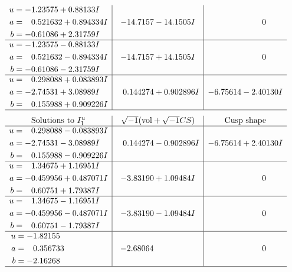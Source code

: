 \documentclass[1p]{elsarticle_modified}
\theoremstyle{definition}
\newcommand{\I}{\sqrt{-1}}
\begin{document}
$$\begin{array}{c|c|c}
\begin{aligned}
u &= -1.23575 + 0.88133 I \\
a &= \phantom{-}0.521632 + 0.894334 I \\
b &= -0.61086 + 2.31759 I\end{aligned}
 & -14.7157 - 14.1505 I & \phantom{-0.000000 } 0 \\ \hline\begin{aligned}
u &= -1.23575 - 0.88133 I \\
a &= \phantom{-}0.521632 - 0.894334 I \\
b &= -0.61086 - 2.31759 I\end{aligned}
 & -14.7157 + 14.1505 I & \phantom{-0.000000 } 0 \\ \hline\begin{aligned}
u &= \phantom{-}0.298088 + 0.083893 I \\
a &= -2.74531 + 3.08989 I \\
b &= \phantom{-}0.155988 + 0.909226 I\end{aligned}
 & \phantom{-}0.144274 + 0.902896 I & -6.75614 - 2.40130 I\\
 \hline 
 \end{array}$$\newpage$$\begin{array}{c|c|c}  
\text{Solutions to }I^u_{1}& \I (\text{vol} + \sqrt{-1}CS) & \text{Cusp shape}\\
 \hline 
\begin{aligned}
u &= \phantom{-}0.298088 - 0.083893 I \\
a &= -2.74531 - 3.08989 I \\
b &= \phantom{-}0.155988 - 0.909226 I\end{aligned}
 & \phantom{-}0.144274 - 0.902896 I & -6.75614 + 2.40130 I \\ \hline\begin{aligned}
u &= \phantom{-}1.34675 + 1.16951 I \\
a &= -0.459956 + 0.487071 I \\
b &= \phantom{-}0.60751 + 1.79387 I\end{aligned}
 & -3.83190 + 1.09484 I & \phantom{-0.000000 } 0 \\ \hline\begin{aligned}
u &= \phantom{-}1.34675 - 1.16951 I \\
a &= -0.459956 - 0.487071 I \\
b &= \phantom{-}0.60751 - 1.79387 I\end{aligned}
 & -3.83190 - 1.09484 I & \phantom{-0.000000 } 0 \\ \hline\begin{aligned}
u &= -1.82155\phantom{ +0.000000I} \\
a &= \phantom{-}0.356733\phantom{ +0.000000I} \\
b &= -2.16268\phantom{ +0.000000I}\end{aligned}
 & -2.68064\phantom{ +0.000000I} & \phantom{-0.000000 } 0\\
 \hline 
 \end{array}$$\newpage\newpage\renewcommand{\arraystretch}{1}
\end{document}

